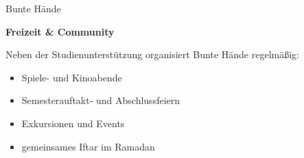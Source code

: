 \begin{initiativkarte}{Bunte Hände}
  \vspace{0.2cm}

  \textbf{Freizeit \& Community}

  Neben der Studienunterstützung organisiert Bunte Hände regelmäßig:

  \begin{itemize}
    \item Spiele- und Kinoabende
    \item Semesterauftakt- und Abschlussfeiern
    \item Exkursionen und Events
    \item gemeinsames Iftar im Ramadan
  \end{itemize}

  \vspace{0.2cm}


  \vspace{0.2cm}
  \hawrule


\end{initiativkarte}

